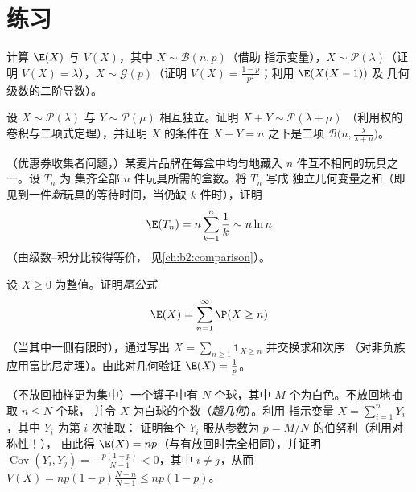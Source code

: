 \section{练习}

\begin{exercise}[$\star$]\label{exo:b2:randomvar:1}
计算 $\E(X)$ 与 $V(X)$，其中 $X \sim \mathcal{B}(n, p)$（借助
指示变量），$X \sim \mathcal{P}(\lambda)$（证明 $V(X) =
\lambda$），$X \sim \mathcal{G}(p)$（证明 $V(X) =
\frac{1-p}{p^2}$；利用 $\E(X(X-1))$ 及
几何级数的二阶导数）。
\end{exercise}

\begin{exercise}[$\star$]\label{exo:b2:randomvar:2}
设 $X \sim \mathcal{P}(\lambda)$ 与 $Y \sim \mathcal{P}(\mu)$
相互独立。证明 $X + Y \sim \mathcal{P}(\lambda + \mu)$
（利用权的卷积与二项式定理），并证明
$X$ 的条件在 $X + Y = n$ 之下是二项
$\mathcal{B}\bigl(n, \frac{\lambda}{\lambda + \mu}\bigr)$。
\end{exercise}

\begin{exercise}[$\star$]\label{exo:b2:randomvar:3}
（优惠券收集者问题，）某麦片品牌在每盒中均匀地藏入
$n$ 件互不相同的玩具之一。设 $T_n$ 为
集齐全部 $n$ 件玩具所需的盒数。将 $T_n$ 写成
独立几何变量之和（即见到一件\emph{新}玩具的等待时间，当仍缺
$k$ 件时），证明
\[
\E(T_n) = n\sum_{k=1}^{n}\frac{1}{k} \sim n\ln n
\]
（由级数–积分比较得等价，
见\cref{ch:b2:comparison}）。
\end{exercise}

\begin{exercise}[$\star\star$]\label{exo:b2:randomvar:4}
设 $X \geq 0$ 为整值。证明\emph{尾公式}
\[
\E(X) = \sum_{n=1}^{\infty} \P(X \geq n)
\]
（当其中一侧有限时），通过写出 $X =
\sum_{n\geq1}\mathbf{1}_{X \geq n}$ 并交换求和次序
（对非负族应用富比尼定理）。由此对几何验证
$\E(X) = \frac1p$。
\end{exercise}

\begin{exercise}[$\star\star$]\label{exo:b2:randomvar:5}
（不放回抽样更为集中）一个罐子中有 $N$
个球，其中 $M$ 个为白色。不放回地抽取 $n \leq N$ 个球，
并令 $X$ 为白球的个数（\emph{超几何}）。利用
指示变量 $X = \sum_{i=1}^n Y_i$，其中 $Y_i$ 为第 $i$ 次抽取：
证明每个 $Y_i$ 服从参数为 $p = M/N$ 的伯努利（利用对称性！），
由此得 $\E(X) = np$（与有放回时完全相同），并证明
$\operatorname{Cov}(Y_i, Y_j) = -\frac{p(1-p)}{N-1} < 0$，其中 $i
\neq j$，从而 $V(X) = np(1-p)\frac{N - n}{N - 1} \leq np(1-p)$。
\end{exercise}

